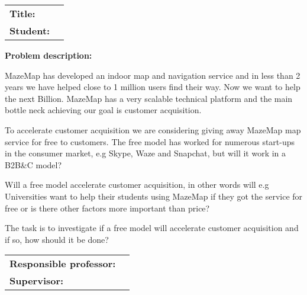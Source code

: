 \begin{titlingpage}

\noindent
\begin{tabular}{@{}p{2cm}l}
\textbf{Title:} 	& \thetitle \\
\textbf{Student:}	& \theauthor \\
\end{tabular}

\vspace{4ex}
\noindent\textbf{Problem description:}
\vspace{2ex}


MazeMap has developed an indoor map and navigation service and in less than 2 years we have helped close to 1 million users find their way. Now we want to help the next Billion. MazeMap has a very scalable technical platform and the main bottle neck achieving our goal is customer acquisition. 

To accelerate customer acquisition we are considering giving away MazeMap map service for free to customers. The free model has worked for numerous start-ups in the consumer market, e.g Skype, Waze and Snapchat, but will it work in a B2B\&C model?

Will a free model accelerate customer acquisition, in other words will e.g Universities want to help their students using MazeMap if they got the service for free or is there other factors more important than price? 

The task is to investigate if a free model will accelerate customer acquisition and if so, how should it be done?
\vspace{6ex}

\noindent
\begin{tabular}{@{}p{4cm}l}
\textbf{Responsible professor:} 	& \theprofessor \\
\textbf{Supervisor:}			& \thesupervisor \\
\end{tabular}

\end{titlingpage}
